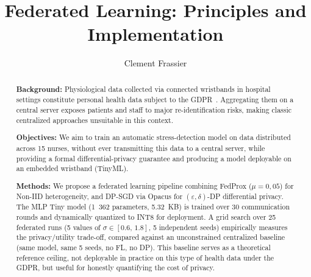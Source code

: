 \documentclass{article}
\begin{document}
\title[Federated Learning - Stress Detection]{Federated Learning: Principles and Implementation}

\author{Clement Frassier}

\begin{abstract}
{\bf Background:}
Physiological data collected via connected wristbands in hospital settings constitute
personal health data subject to the GDPR~\cite{gdpr2016}. Aggregating them on a
central server exposes patients and staff to major re-identification risks, making
classic centralized approaches unsuitable in this context.

{\bf Objectives:}
We aim to train an automatic stress-detection model on data distributed across 15
nurses, without ever transmitting this data to a central server, while providing a
formal differential-privacy guarantee and producing a model deployable on an embedded
wristband (TinyML).

{\bf Methods:}
We propose a federated learning pipeline combining FedProx ($\mu = 0{,}05$) for
Non-IID heterogeneity, and DP-SGD via Opacus for $(\varepsilon, \delta)$-DP
differential privacy. The MLP Tiny model (1~362 parameters, 5.32~KB) is trained over
30 communication rounds and dynamically quantized to INT8 for deployment. A grid
search over 25 federated runs (5 values of $\sigma \in [0.6,\, 1.8]$, 5 independent
seeds) empirically measures the privacy/utility trade-off, compared against an
unconstrained centralized baseline (same model, same 5 seeds, no FL, no DP). This
baseline serves as a theoretical reference ceiling, not deployable in practice on
this type of health data under the GDPR, but useful for honestly quantifying the
cost of privacy.


\end{abstract}
\end{document}
